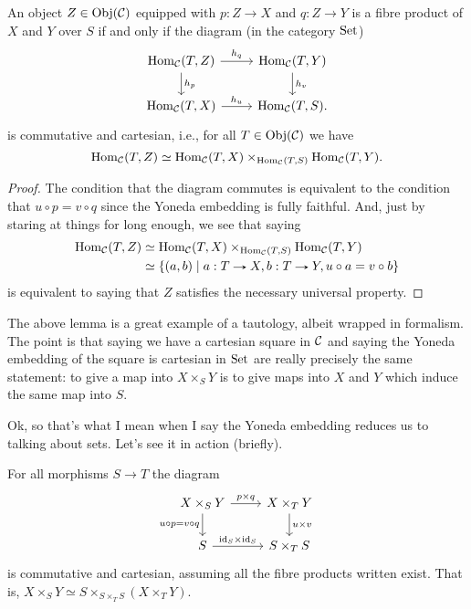 \begin{lemma}
  \label{magic}
  An object $Z \in \operatorname{Obj}(\mathcal{C})$ equipped with $p : Z \to X$ and $q : Z \to
  Y$ is a fibre product of $X$ and $Y$ over $S$ if and only if the
  diagram (in the category $\mathrm{Set}$)
  \[
  \begin{tikzcd}
    \Hom_\C(T, Z) \rar{h_q} \dar{h_p} & \Hom_\C(T, Y) \dar{h_v}
    \\ \Hom_\C(T,X) \rar{h_u} & \Hom_\C(T,S).
  \end{tikzcd}
  \]
  is commutative and cartesian, i.e., for all $T \in \operatorname{Obj}(\mathcal{C})$ we have
  \[
  \operatorname{Hom}_{\mathcal{C}}(T,Z) \simeq \operatorname{Hom}_{\mathcal{C}}(T,X) \times_{\operatorname{Hom}_{\mathcal{C}}(T,S)}
  \operatorname{Hom}_{\mathcal{C}}(T,Y).
  \]
\end{lemma}

\begin{proof}
  The condition that the diagram commutes is equivalent to the
  condition that $u \circ p = v \circ q$ since the Yoneda embedding is
  fully faithful. And, just by staring at things for long enough, we
  see that saying
  \begin{align*}
  \Hom_\C(T,Z) &\simeq \Hom_\C(T,X) \times_{\Hom_\C(T,S)} \Hom_\C(T,Y)
  \\ &\simeq \{(a, b) \mid a : T \to X, b : T \to Y, u \circ a = v
  \circ b\}
  \end{align*}
  is equivalent to saying that $Z$ satisfies the necessary universal
  property.
\end{proof}

\begin{remark}
  The above lemma is a great example of a tautology, albeit wrapped in
  formalism. The point is that saying we have a cartesian square in
  $\mathcal{C}$ and saying the Yoneda embedding of the square is cartesian in
  $\mathrm{Set}$ are really precisely the same statement: to give a map into
  $X \times_S Y$ is to give maps into $X$ and $Y$ which induce the
  same map into $S$.
\end{remark}

Ok, so that's what I mean when I say the Yoneda embedding reduces us
to talking about sets. Let's see it in action (briefly).

\begin{lemma}
  For all morphisms $S \to T$ the diagram
  \[
  \begin{tikzcd}
    X \times_S Y \rar{p \times q} \ar{d}[left]{u \circ p = v \circ q}
    & X \times_T Y \dar{u \times v} \\ S \rar{\id_S \times \id_S} & S
    \times_T S
  \end{tikzcd}
  \]
  is commutative and cartesian, assuming all the fibre products
  written exist. That is, $X \times_S Y \simeq S \times_{S \times_T S}
  (X \times_T Y)$.
\end{lemma}

